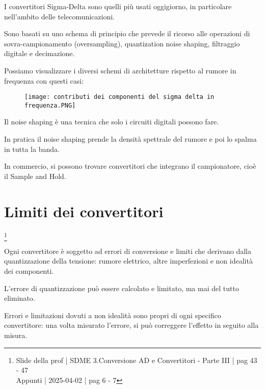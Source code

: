 I convertitori Sigma-Delta sono quelli più usati oggigiorno, in particolare nell'ambito delle telecomunicazioni. \newline 

Sono basati su uno schema di principio che prevede il ricorso alle operazioni di sovra-campionamento (oversampling), 
quantization noise shaping, filtraggio digitale e decimazione. \newline 

Possiamo visualizzare i diversi schemi di architetture rispetto al rumore in frequenza con questi casi: 

\begin{figure}[h]
    \centering
    \texttt{[image: contributi dei componenti del sigma delta in frequenza.PNG]}
\end{figure}

\newpage 

Il noise shaping è una tecnica che solo i circuiti digitali possono fare. \newline

In pratica il noise shaping prende la densità spettrale del rumore e poi lo spalma in tutta la banda. \newline 

In commercio, si possono trovare convertitori che integrano il campionatore, cioè il Sample and Hold. \newline 

\newpage 

\section{Limiti dei convertitori}
\footnote{Slide della prof | SDME 3.Conversione AD e Convertitori - Parte III | pag 43 - 47 \\  
Appunti | 2025-04-02 | pag 6 - 7}

Ogni convertitore è soggetto ad errori di conversione e limiti che derivano dalla quantizzazione della tensione: rumore elettrico, altre imperfezioni e non idealità dei componenti. \newline 

L'errore di quantizzazione può essere calcolato e limitato, ma mai del tutto eliminato. \newline 

Errori e limitazioni dovuti a non idealità sono propri di ogni specifico convertitore: 
una volta misurato l'errore, si può correggere l'effetto in seguito alla misura. \newline 

